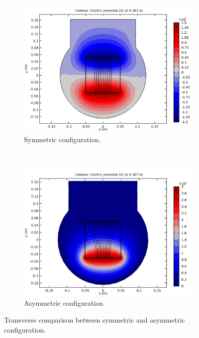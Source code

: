 \begin{figure}[!ht]
	\begin{subfigure}{0.5\textwidth}
		\includegraphics[width=\textwidth]{03_Prototype/figures/fig021_image_asym_sym_b.png}
		\caption{Symmetric configuration.}
		\label{chap3:asym_sym_b}
	\end{subfigure}
	~
	\begin{subfigure}{0.5\textwidth}
		\includegraphics[width=\textwidth]{03_Prototype/figures/fig021_image_asym_sym_a.png}
		\caption{Asymmetric configuration.}
		\label{chap3:asym_sym_a}
	\end{subfigure}
	\caption[Transverse comparison between symmetric and asymmetric configuration]{Transverse comparison between symmetric and asymmetric configuration.}
	\label{chap3:asym_sym}
\end{figure}

